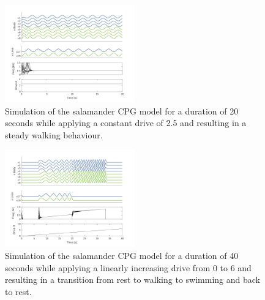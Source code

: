 \documentclass[a4paper]{scrartcl}
\begin{document}
{\begin{figure}[!h]
	\includegraphics[width=0.5\textwidth]{fig/figure7a-walk.png}
	\caption{Simulation of the salamander CPG model for a duration of 20 seconds while applying a constant drive of 2.5 and resulting in a steady walking behaviour.}
	\label{fig:7a-walk}
\end{figure}

\begin{figure}[!h]
	\includegraphics[width=0.5\textwidth]{fig/figure7a-drivegradient.png}
	\caption{Simulation of the salamander CPG model for a duration of 40 seconds while applying a linearly increasing drive from 0 to 6 and resulting in a transition from rest to walking to swimming and back to rest.}
	\label{fig:7a-transition}
\end{figure}

}
\end{document}
